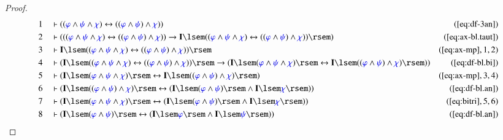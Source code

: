 \begin{proof}
\begin{align}
  1 &&  & \vdash ( ( \mw{\varphi} \wedge \mw{\psi} \wedge \mw{\chi} )
      \leftrightarrow ( ( \mw{\varphi} \wedge \mw{\psi} )
      \wedge \mw{\chi} ) )&(\mbox{\ref{eq:df-3an}})\notag
  \\ 2 &&  & \vdash ( ( ( \mw{\varphi} \wedge \mw{\psi} \wedge \mw{\chi} )
      \leftrightarrow ( ( \mw{\varphi} \wedge \mw{\psi} )
      \wedge \mw{\chi} ) ) \rightarrow \mathbf{I} \lsem ( (
      \mw{\varphi} \wedge \mw{\psi} \wedge \mw{\chi} )
      \leftrightarrow ( ( \mw{\varphi} \wedge \mw{\psi} )
      \wedge \mw{\chi} ) ) \rsem
      )&(\mbox{\ref{eq:ax-bl.taut}})\notag
  \\ 3 &&  & \vdash \mathbf{I} \lsem ( ( \mw{\varphi} \wedge \mw{\psi} \wedge
      \mw{\chi} ) \leftrightarrow ( ( \mw{\varphi} \wedge
      \mw{\psi} ) \wedge \mw{\chi} ) )
      \rsem&(\mbox{\ref{eq:ax-mp}},1,2)\notag
  \\ 4 &&  & \vdash ( \mathbf{I} \lsem ( ( \mw{\varphi} \wedge \mw{\psi} \wedge
      \mw{\chi} ) \leftrightarrow ( ( \mw{\varphi} \wedge
      \mw{\psi} ) \wedge \mw{\chi} ) ) \rsem
      \rightarrow ( \mathbf{I} \lsem ( \mw{\varphi}
      \wedge \mw{\psi} \wedge \mw{\chi} ) \rsem
      \leftrightarrow \mathbf{I} \lsem ( ( \mw{\varphi}
      \wedge \mw{\psi} ) \wedge \mw{\chi} ) \rsem )
      )&(\mbox{\ref{eq:df-bl.bi}})\notag
  \\ 5 &&  & \vdash ( \mathbf{I} \lsem ( \mw{\varphi} \wedge \mw{\psi} \wedge
      \mw{\chi} ) \rsem \leftrightarrow \mathbf{I} \lsem (
      ( \mw{\varphi} \wedge \mw{\psi} ) \wedge \mw{\chi} )
      \rsem )&(\mbox{\ref{eq:ax-mp}},3,4)\notag
  \\ 6 &&  & \vdash ( \mathbf{I} \lsem ( ( \mw{\varphi} \wedge \mw{\psi} )
      \wedge \mw{\chi} ) \rsem \leftrightarrow ( \mathbf{I}
      \lsem ( \mw{\varphi} \wedge \mw{\psi} ) \rsem \wedge
      \mathbf{I} \lsem \mw{\chi} \rsem )
      )&(\mbox{\ref{eq:df-bl.an}})\notag
  \\ 7 &&  & \vdash ( \mathbf{I} \lsem ( \mw{\varphi} \wedge \mw{\psi} \wedge
      \mw{\chi} ) \rsem \leftrightarrow ( \mathbf{I} \lsem
      ( \mw{\varphi} \wedge \mw{\psi} ) \rsem \wedge
      \mathbf{I} \lsem \mw{\chi} \rsem )
      )&(\mbox{\ref{eq:bitri}},5,6)\notag
  \\ 8 &&  & \vdash ( \mathbf{I} \lsem ( \mw{\varphi} \wedge \mw{\psi} ) \rsem
      \leftrightarrow ( \mathbf{I} \lsem \mw{\varphi} \rsem
      \wedge \mathbf{I} \lsem \mw{\psi} \rsem )
      )&(\mbox{\ref{eq:df-bl.an}})\notag

\end{align}
\end{proof}
